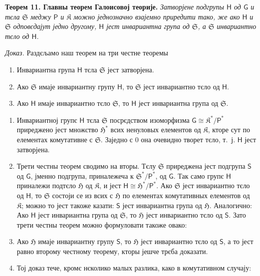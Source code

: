 \documentclass[11pt]{article}
\begin{document}
\textbf{Теорем 11. Главны теорем Галоисовој теорије.} \emph{Затворјене подгрупы \(\mathsf{H}\) од \(\mathsf{G}\) и тєла \(\mathfrak S\) меджу \(\mathsf P\) и \(\mathfrak K\) можно једнозначно взајемно приредити тако, же ако \(\mathsf{H}\) и \(\mathfrak S\) одповєдајут једно другому, \(\mathsf{H}\) јест инвариантна група од \(\mathfrak S\), а \(\mathfrak S\) инвариантно тєло од \(\mathsf{H}\).}

\emph{Доказ.} Раздєљамо наш теорем на три честне теоремы
\begin{enumerate}
\item Инвариантна група \(\mathsf{H}\) тєла \(\mathfrak S\) јест затворјена.
\item Ако \(\mathfrak S\) имаје инвариантну групу \(\mathsf{H}\), то \(\mathfrak S\) јест инвариантно тєло од \(\mathsf{H}\).
\item Ако \(\mathsf{H}\) имаје инвариантно тєло \(\mathfrak S\), то \(\mathsf{H}\) јест инвариантна група од \(\mathfrak S\).
\end{enumerate}

\begin{enumerate}
\item Инвариантној групє \(\mathsf{H}\) тєла \(\mathfrak S\) посрєдством изоморфизма \(\mathsf{G}\cong \mathfrak K^*/\mathsf P^*\) приреджено јест множство \(\mathfrak H^*\) всих ненуловых елементов од \(\mathfrak K\), кторе сут по елементах комутативне с \(\mathfrak S\). Заједно с 0 она очевидно творет тєло, т.~ј. \(\mathsf{H}\) јест затворјена.

\item Трети честны теорем сводимо на вторы. Тєлу \(\mathfrak S\) приреджена јест подгрупа \(\mathsf{S}\) од \(\mathsf{G}\), јменно подгрупа, приналежеча к \(\mathfrak S^*/\mathsf P^*\), од \(\mathsf{G}\). Так само групє \(\mathsf{H}\) приналежи подтєло \(\mathfrak H\) од \(\mathfrak K\), и јест \(\mathsf{H}\cong \mathfrak H^*/\mathsf P^*\). Ако \(\mathfrak S\) јест инвариантно тєло од \(\mathsf{H}\), то \(\mathfrak S\) состоји се из всих с \(\mathfrak H\) по елементах комутативных елементов од \(\mathfrak K\); можно то јест такоже казати: \(\mathsf{S}\) јест инвариантна група од \(\mathfrak H\). Аналогично: Ако \(\mathsf{H}\) јест инвариантна група од \(\mathfrak S\), то \(\mathfrak H\) јест инвариантно тєло од \(\mathsf{S}\). Зато трети честны теорем можно формуловати такоже овако:

\item[\(3'\).] Ако \(\mathfrak H\) имаје инвариантну групу \(\mathsf{S}\), то \(\mathfrak H\) јест инвариантно тєло од \(\mathsf{S}\), а то јест равно второму честному теорему, кторы јешче трєба доказати.

\item[3.] Тој доказ тече, кромє нєколико малых разлика, како в комутативном случају:
\end{enumerate}
\end{document}
